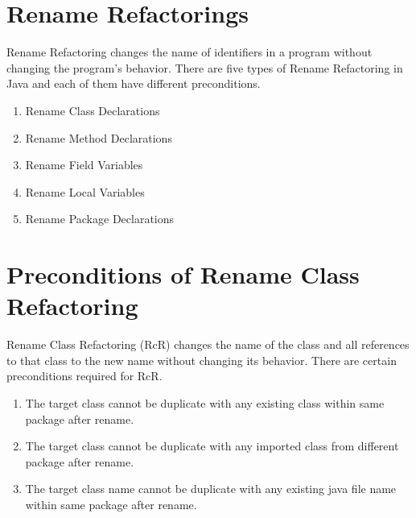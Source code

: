 \documentclass[10pt,conference]{IEEEtran}
\begin{document}
\section{\textbf{Rename Refactorings}}
Rename Refactoring changes the name of identifiers in a program without changing the program's behavior.
There are five types of Rename Refactoring in Java and each of them have different preconditions. 
\begin{enumerate}
	\item Rename Class Declarations 
	\item Rename Method Declarations  
	\item Rename Field Variables
	\item Rename Local Variables 
	\item Rename Package Declarations
\end{enumerate}

\section{\textbf{Preconditions of Rename Class Refactoring}}
Rename Class Refactoring (RcR) changes the name of the class and all references to that class to the new name without changing its behavior. There are certain preconditions required for RcR. 
\begin{enumerate}
	\item The target class cannot be duplicate with any existing class within same package after rename.
	\item The target class cannot be duplicate with any imported class from different package after rename.
	\item The target class name cannot be duplicate with any existing java file name within same package after rename.
\end{enumerate}

\label{sec:precon1}
	
\label{sec:precon2}

\label{sec:precon3}



 



















\end{document}
